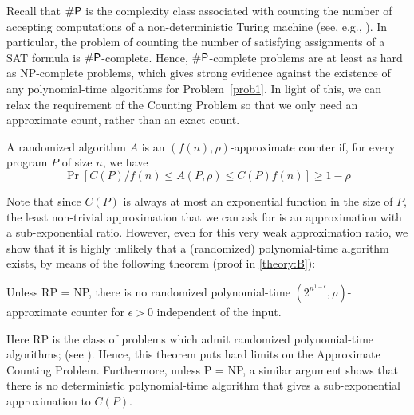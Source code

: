 Recall that $\#\mathsf{P}$ is the complexity class associated with counting the number
of accepting computations of a non-deterministic Turing machine (see, e.g., \cite{aroraBarak}). 
In particular, the problem of counting the number of satisfying assignments of a SAT formula is 
$\#\mathsf{P}$-complete. 
Hence, $\#\mathsf{P}$-complete problems are at least as hard as NP-complete problems, which 
gives strong evidence against the existence of any polynomial-time
algorithms for Problem~\ref{prob1}. 
In light of this, we can relax the requirement of the Counting Problem 
so that we only need an approximate count, rather than an exact count.



\begin{problem}
    \label{prob2}
    A randomized algorithm $A$ is an $(f(n), \rho)$-approximate counter if, for every program $P$ of size $n$, we have
    \[
    \operatorname{Pr}[C(P)/f(n) \leq A(P, \rho) \leq C(P)f(n)] \geq 1 - \rho
    \]
\end{problem}

Note that since $C(P)$ is always at most an exponential function in the size of $P$,
the least non-trivial approximation that we can ask for is an approximation
with a sub-exponential ratio. 
However, even for this very weak approximation ratio, we show that it is highly unlikely that a (randomized) polynomial-time algorithm exists, by means of the following theorem
(proof in \cref{theory:B}):

\begin{theorem}\label{thm:approximate-counting-problem-hardness}
 Unless RP = NP, there is no randomized polynomial-time $(2^{n^{1-\epsilon}}, \rho)$-approximate 
 counter for $\epsilon > 0$ independent of the input.
\end{theorem}

Here RP is the class of problems which admit randomized polynomial-time algorithms;
(see \cite{aroraBarak}). Hence, this theorem puts hard limits on the Approximate Counting Problem. 
Furthermore, unless P = NP, a similar argument shows that there is no deterministic polynomial-time
algorithm that gives a sub-exponential approximation to $C(P)$. 

